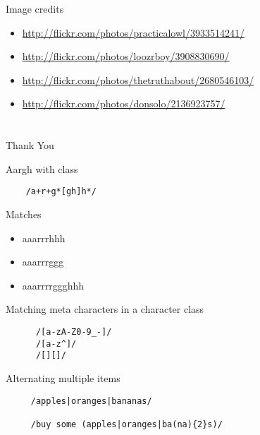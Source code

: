 \documentclass{beamer}
\begin{document}
\begin{frame}{Image credits}
  \begin{itemize}
  \item \small{\href{http://www.flickr.com/photos/practicalowl/3933514241/}{http://flickr.com/photos/practicalowl/3933514241/}}
  \item \small{\href{http://www.flickr.com/photos/loozrboy/3908830690/}{http://flickr.com/photos/loozrboy/3908830690/}}
  \item \small{\href{http://www.flickr.com/photos/thetruthabout/2680546103/}{http://flickr.com/photos/thetruthabout/2680546103/}}
  \item \small{\href{http://www.flickr.com/photos/donsolo/2136923757/}{http://flickr.com/photos/donsolo/2136923757/}}
  \end{itemize}
\end{frame}

\section*{}

\subsection*{}

\begin{frame}{}
  \begin{center}
  Thank You
  \end{center}
\end{frame}

\begin{frame}[fragile]{Aargh with class}
  \begin{verbatim}
    /a+r+g*[gh]h*/
  \end{verbatim}
  \begin{block}{Matches}
    \begin{itemize}
    \item aaarrrhhh
    \item aaarrrggg
    \item aaarrrrggghhh
    \end{itemize}
  \end{block}
\end{frame}

\begin{frame}[fragile]{Matching meta characters in a character class}
  \begin{verbatim}
      /[a-zA-Z0-9_-]/
      /[a-z^]/
      /[][]/
  \end{verbatim}
\end{frame}

\begin{frame}[fragile]{Alternating multiple items}
  \begin{verbatim}
     /apples|oranges|bananas/

     /buy some (apples|oranges|ba(na){2}s)/
  \end{verbatim}
\end{frame}
\end{document}
